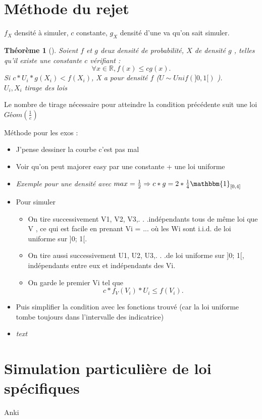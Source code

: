 \documentclass{article}
\newtheorem{thm}{Théorème}[]
\begin{document}
\section{Méthode du rejet }
$ f_X $ densité à simuler, $ c $ constante, $ g_X $ densité d'une va qu'on sait simuler.

\begin{thm}[]
    Soient $ f $ et $ g $ deux densité de probabilité, $ X $ de densité $ g $ , telles qu'il existe une constante $ c $ vérifiant :
    \[
        \forall x \in \mathbb{R}, f(x) \leq cg(x)
    .\]
    Si $ c*U_i*g(X_i) < f(X_i) $, X a pour densité $ f $ ($ U \sim Unif(]0,1[) $ ).\\
    $ U_i, X_i $ tirage des lois
\end{thm}
Le nombre de tirage nécessaire pour atteindre la condition précédente suit une loi $ Géom(\frac{1}{c}) $ 

Méthode pour les exos : 
\begin{itemize}
    \item J'pense dessiner la courbe c'est pas mal 
    \item Voir qu'on peut majorer easy par une constante + une loi uniforme 
    \item \textit{Exemple pour une densité avec $ max=\frac{1}{2} \Rightarrow  c*g = 2 * \frac{1}{4} \mathbbm{1}_{[0,4]} $ }
    \item Pour simuler \begin{itemize}
        \item On tire successivement V1, V2, V3,. . .indépendants tous de même loi que V , ce qui est facile en prenant Vi = ... où les Wi sont i.i.d. de loi uniforme sur ]0; 1[.
        \item On tire aussi successivement U1, U2, U3,. . .de loi uniforme sur ]0; 1[, indépendants entre eux et indépendants des Vi.
        \item On garde le premier Vi tel que
            \[
                c*f_V(V_i)*U_i \leq  f(V_i)
            .\]
    \end{itemize}
    \item Puis simplifier la condition avec les fonctions trouvé (car la loi uniforme tombe toujours dans l'intervalle des indicatrice)
    \item \textit{text}
\end{itemize}

\section{Simulation particulière de loi spécifiques}
Anki
\end{document}
